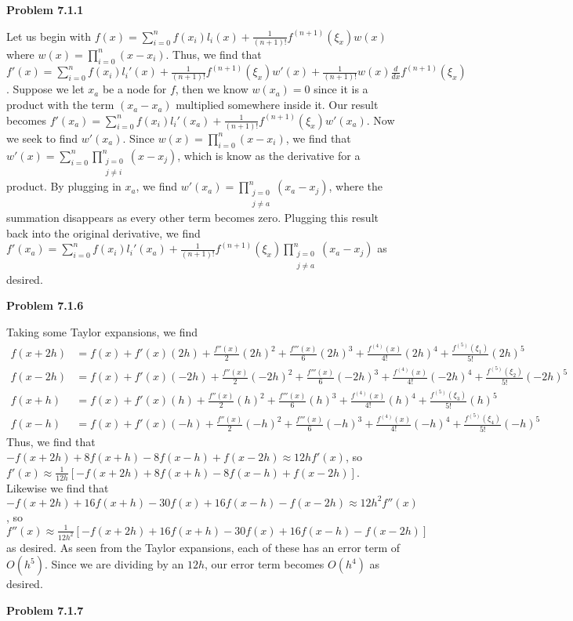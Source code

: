 \documentclass{article}
\newcommand{\Problem}[1]{\textbf{Problem #1}}
\begin{document}
\Problem{7.1.1}

Let us begin with $f(x) = \displaystyle\sum_{i=0}^n f(x_i)l_i(x) + \frac{1}{(n+1)!}f^{(n+1)}(\xi_x)w(x)$ where $w(x) = \prod_{i=0}^n (x-x_i)$. Thus, we find that $f'(x) = \displaystyle\sum_{i=0}^n f(x_i)l_i'(x) + \frac{1}{(n+1)!}f^{(n+1)}(\xi_x)w'(x) + \frac{1}{(n+1)!}w(x)\frac{d}{dx}f^{(n+1)}(\xi_x)$. Suppose we let $x_a$ be a node for $f$, then we know $w(x_a) = 0$ since it is a product with the term $(x_a-x_a)$ multiplied somewhere inside it. Our result becomes $f'(x_a) = \displaystyle\sum_{i=0}^n f(x_i)l_i'(x_a) + \frac{1}{(n+1)!}f^{(n+1)}(\xi_x)w'(x_a)$. Now we seek to find $w'(x_a)$. Since $w(x) = \displaystyle\prod_{i=0}^n (x-x_i)$, we find that $w'(x) = \displaystyle\sum_{i=0}^n\displaystyle\prod_{\substack{j = 0 \\ j \neq i}}^n(x-x_j)$, which is know as the derivative for a product. By plugging in $x_a$, we find $w'(x_a) = \displaystyle\prod_{\substack{j = 0 \\ j \neq a}}^n (x_a - x_j)$, where the summation disappears as every other term becomes zero. Plugging this result back into the original derivative, we find $f'(x_a) = \displaystyle\sum_{i=0}^n f(x_i)l_i'(x_a) + \frac{1}{(n+1)!}f^{(n+1)}(\xi_x)\displaystyle\prod_{\substack{j = 0 \\ j \neq a}}^n (x_a - x_j)$ as desired. 

\Problem{7.1.6}

Taking some Taylor expansions, we find 
\begin{align*}
f(x+2h) &= f(x) + f'(x)(2h) + \frac{f''(x)}{2}(2h)^2 + \frac{f'''(x)}{6}(2h)^3 + \frac{f^{(4)}(x)}{4!}(2h)^4 + \frac{f^{(5)}(\xi_1)}{5!}(2h)^5\\
f(x-2h) &= f(x) + f'(x)(-2h) + \frac{f''(x)}{2}(-2h)^2 + \frac{f'''(x)}{6}(-2h)^3 + \frac{f^{(4)}(x)}{4!}(-2h)^4 + \frac{f^{(5)}(\xi_2)}{5!}(-2h)^5\\
f(x+h) &= f(x) + f'(x)(h) + \frac{f''(x)}{2}(h)^2 + \frac{f'''(x)}{6}(h)^3 + \frac{f^{(4)}(x)}{4!}(h)^4 + \frac{f^{(5)}(\xi_3)}{5!}(h)^5\\
f(x-h) &= f(x) + f'(x)(-h) + \frac{f''(x)}{2}(-h)^2 + \frac{f'''(x)}{6}(-h)^3 + \frac{f^{(4)}(x)}{4!}(-h)^4 + \frac{f^{(5)}(\xi_4)}{5!}(-h)^5
\end{align*}
Thus, we find that $-f(x+2h) + 8f(x+h) - 8f(x-h) + f(x-2h) \approx 12hf'(x)$, so $f'(x) \approx \frac{1}{12h}[-f(x+2h) + 8f(x+h) - 8f(x-h) + f(x-2h)]$. Likewise we find that $-f(x+2h) + 16f(x+h) - 30f(x) + 16f(x-h) - f(x-2h) \approx 12h^2f''(x)$, so $f''(x) \approx \frac{1}{12h^2}[-f(x+2h) + 16f(x+h) - 30f(x) + 16f(x-h) - f(x-2h)]$ as desired. As seen from the Taylor expansions, each of these has an error term of $O(h^5)$. Since we are dividing by an $12h$, our error term becomes $O(h^4)$ as desired. 



\Problem{7.1.7}
\end{document}
